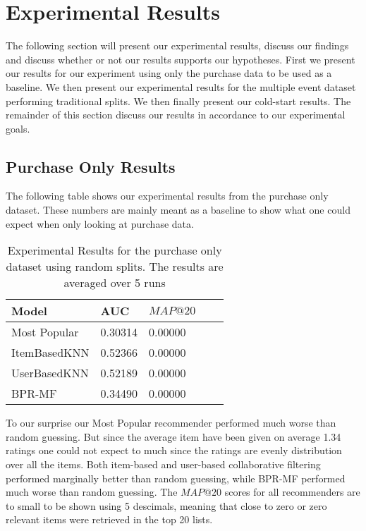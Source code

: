 
\section{Experimental Results}
\label{sec:results}

The following section will present our experimental results, discuss our findings and
discuss whether or not our results supports our hypotheses. First we present our results
for our experiment using only the purchase data to be used as a baseline. We then present
our experimental results for the multiple event dataset performing traditional splits.
We then finally present our cold-start results. The remainder of this section
discuss our results in accordance to our experimental goals.

\subsection{Purchase Only Results}

The following table shows our experimental results from the purchase only dataset. These numbers
are mainly meant as a baseline to show what one could expect when only looking at purchase data.

\begin{table}[H]
    \centering
    \begin{tabular}{*{5}l}
    \toprule
    Model           &   AUC         &   $MAP@20$ \\ \midrule
    \rowcolor{Gray}
    Most Popular    &   0.30314     &   0.00000 \\
    ItemBasedKNN    &   0.52366     &   0.00000 \\
    UserBasedKNN    &   0.52189     &   0.00000 \\
    BPR-MF          &   0.34490     &   0.00000 \\
    \bottomrule
    \end{tabular}
\caption[Experimental Results - Purchase Only Dataset]{Experimental Results for the purchase only dataset using random splits. The results are averaged over 5 runs}
\label{table:results-purchase-only}
\end{table}

To our surprise our Most Popular recommender performed much worse than random guessing. But since the average item
have been given on average 1.34 ratings one could not expect to much since the ratings are evenly distribution over
all the items. Both item-based and user-based collaborative filtering performed marginally better than random guessing,
while BPR-MF performed much worse than random guessing. The $MAP@20$ scores for all recommenders are to small to be shown
using 5 descimals, meaning that close to zero or zero relevant items were retrieved in the top 20 lists.

